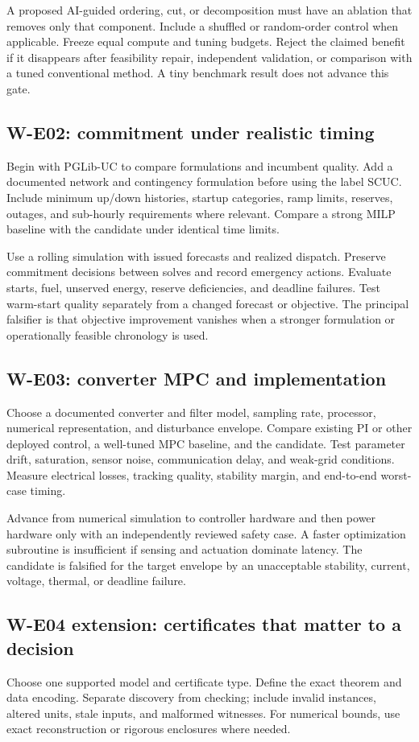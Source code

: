 \documentclass[11pt,letterpaper]{article}
\begin{document}
A proposed AI-guided ordering, cut, or decomposition must have an ablation that removes only that component. Include a shuffled or random-order control when applicable. Freeze equal compute and tuning budgets. Reject the claimed benefit if it disappears after feasibility repair, independent validation, or comparison with a tuned conventional method. A tiny benchmark result does not advance this gate.

\subsection{W-E02: commitment under realistic timing}
Begin with PGLib-UC to compare formulations and incumbent quality. Add a documented network and contingency formulation before using the label SCUC. Include minimum up/down histories, startup categories, ramp limits, reserves, outages, and sub-hourly requirements where relevant. Compare a strong MILP baseline with the candidate under identical time limits.

Use a rolling simulation with issued forecasts and realized dispatch. Preserve commitment decisions between solves and record emergency actions. Evaluate starts, fuel, unserved energy, reserve deficiencies, and deadline failures. Test warm-start quality separately from a changed forecast or objective. The principal falsifier is that objective improvement vanishes when a stronger formulation or operationally feasible chronology is used.

\subsection{W-E03: converter MPC and implementation}
Choose a documented converter and filter model, sampling rate, processor, numerical representation, and disturbance envelope. Compare existing PI or other deployed control, a well-tuned MPC baseline, and the candidate. Test parameter drift, saturation, sensor noise, communication delay, and weak-grid conditions. Measure electrical losses, tracking quality, stability margin, and end-to-end worst-case timing.

Advance from numerical simulation to controller hardware and then power hardware only with an independently reviewed safety case. A faster optimization subroutine is insufficient if sensing and actuation dominate latency. The candidate is falsified for the target envelope by an unacceptable stability, current, voltage, thermal, or deadline failure.

\subsection{W-E04 extension: certificates that matter to a decision}
Choose one supported model and certificate type. Define the exact theorem and data encoding. Separate discovery from checking; include invalid instances, altered units, stale inputs, and malformed witnesses. For numerical bounds, use exact reconstruction or rigorous enclosures where needed.
\end{document}
